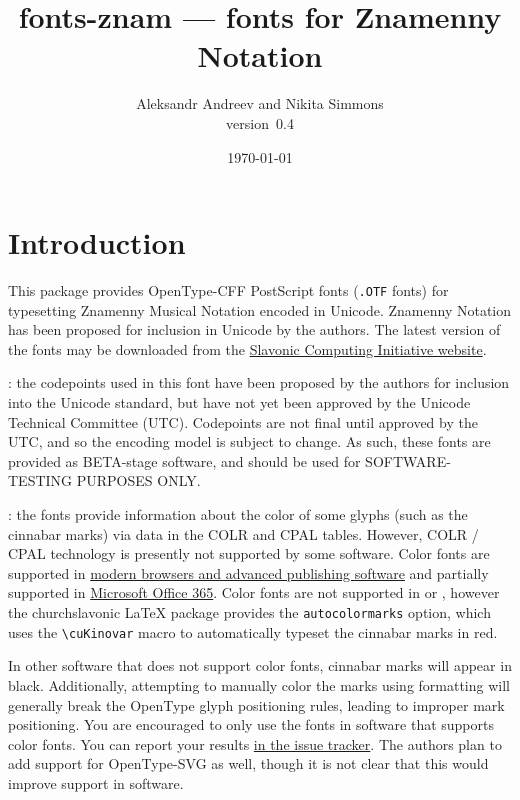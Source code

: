\documentclass[11pt]{article}
\def\fileversion{0.4}
\def\pkg#1{\textsf{#1}}
\def\cs#1{\texttt{\textbackslash #1}}
\begin{document}
\title{\pkg{fonts-znam} --- fonts for Znamenny Notation}
\author{Aleksandr Andreev and Nikita Simmons\\version~\fileversion}
\date{\today}
\maketitle

\tableofcontents

\section{Introduction}
This package provides OpenType-CFF PostScript fonts (\texttt{.OTF} fonts)
for typesetting Znamenny Musical Notation encoded in Unicode. Znamenny
Notation has been proposed for inclusion in Unicode by the authors.
The latest version of the fonts may be downloaded from the
\href{https://sci.ponomar.net/music.html}{Slavonic Computing Initiative website}.

: the codepoints used in this font have been proposed
by the authors for inclusion into the Unicode standard, but have not yet
been approved by the Unicode Technical Committee (UTC). Codepoints are not
final until approved by the UTC, and so the encoding model is subject to change.
As such, these fonts are provided as BETA-stage software, and should be used
for SOFTWARE-TESTING PURPOSES ONLY.

: the fonts provide information about the color of some
glyphs (such as the cinnabar marks) via data in the COLR and CPAL tables.
However, COLR / CPAL technology is presently not supported by some software.
Color fonts are supported in \href{https://www.colorfonts.wtf/}{modern browsers
and advanced publishing software} and partially supported in
\href{https://office-watch.com/2019/color-font-support-in-microsoft-office-the-story-so-far/}{Microsoft
Office 365}. Color fonts are not supported in \XeTeX{} or \LuaTeX{}, however
the \pkg{churchslavonic} \LaTeX{} package provides the \texttt{autocolormarks} option,
which uses the \cs{cuKinovar} macro to automatically typeset the cinnabar marks in red.

In other software that does not support color fonts, cinnabar marks will appear in black.
Additionally, attempting to manually color the marks using formatting will generally
break the OpenType glyph positioning rules, leading to improper mark positioning.
You are encouraged to only use the fonts in software that supports color fonts. You
can report your results \href{https://github.com/slavonic/fonts-znam/issues/19}{in
the issue tracker}. The authors plan to add support for OpenType-SVG as well, though
it is not clear that this would improve support in software.
\end{document}
